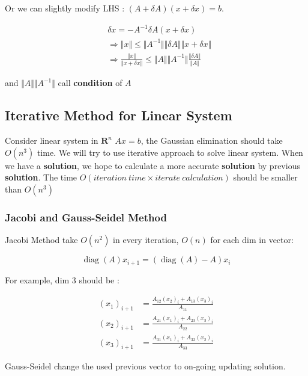 Or we can slightly modify LHS :
$(A + \delta A)(x + \delta x) = b$.

\begin{align}
  &\delta x = -A^{-1}\delta A(x + \delta x) \nonumber \\
  &\Rightarrow \Vert x \Vert \leq
    \Vert A^{-1} \Vert \Vert \delta A \Vert \Vert x + \delta x \Vert \nonumber \\
  &\Rightarrow \frac{\Vert x \Vert}{\Vert x + \delta x \Vert} \leq
    \Vert A \Vert \Vert A^{-1} \Vert \frac{\Vert \delta A \Vert}{\Vert A \Vert} \nonumber
\end{align}

and $\Vert A \Vert \Vert A^{-1} \Vert$ call \textbf{condition} of $A$

\subsection{Iterative Method for Linear System}

Consider linear system in $\mathbf{R}^n$ $Ax = b$,
the Gaussian elimination should take $O(n^3)$ time. 
We will try to use iterative approach to solve linear system.
When we have a \textbf{solution},
we hope to calculate a more accurate \textbf{solution} by previous \textbf{solution}.
The time $O(iteration\ time \times iterate\ calculation)$ should be smaller than $O(n^3)$

\subsubsection{Jacobi and Gauss-Seidel Method}

Jacobi Method take $O(n^2)$ in every iteration, $O(n)$ for each dim in vector:

\newcommand{\diag}{\mathop{\mathrm{diag}}}

\[
  \diag(A)x_{i+1} = (\diag(A) - A)x_i
\]

For example, dim 3 should be :

\begin{align}
  (x_1)_{i+1} &= \frac{A_{12}(x_2)_i + A_{13}(x_3)_i}{A_{11}} \nonumber \\
  (x_2)_{i+1} &= \frac{A_{21}(x_1)_i + A_{23}(x_3)_i}{A_{22}} \nonumber \\
  (x_3)_{i+1} &= \frac{A_{31}(x_1)_i + A_{32}(x_2)_i}{A_{33}} \nonumber
\end{align}

Gauss-Seidel change the used previous vector to on-going updating solution.

